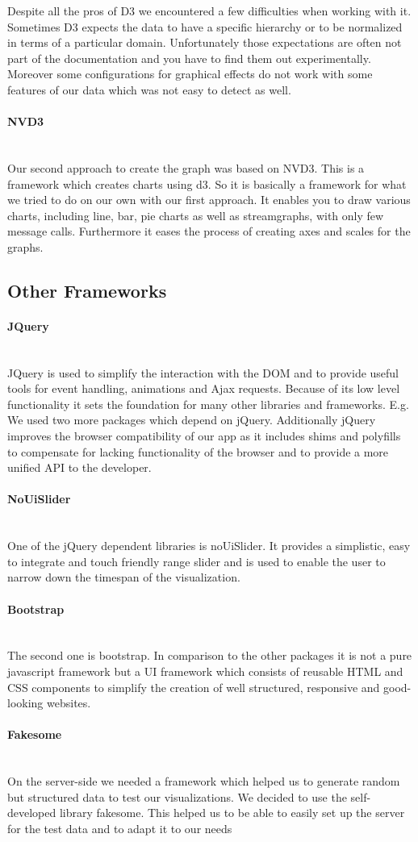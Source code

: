 \documentclass{llncs}
\newcommand{\myparagraph}[1]{\paragraph{#1}\mbox{}\\}
\begin{document}
Despite all the pros of D3 we encountered a few difficulties when working with it. Sometimes D3 expects the data to have a specific hierarchy or to be normalized in terms of a particular domain. Unfortunately those expectations are often not part of the documentation and you have to find them out experimentally. Moreover some configurations for graphical effects do not work with some features of our data which was not easy to detect as well.

\myparagraph{NVD3}
Our second approach to create the graph was based on NVD3. This is a framework which creates charts using d3. So it is basically a framework for what we tried to do on our own with our first approach. It enables you to draw various charts, including line, bar, pie charts as well as streamgraphs, with only few message calls. Furthermore it eases the process of creating axes and scales for the graphs.


\subsection{Other Frameworks}

\myparagraph{JQuery}
JQuery is used to simplify the interaction with the DOM and to provide useful tools for event handling, animations and Ajax requests. Because of its low level functionality it sets the foundation for many other libraries and frameworks. E.g. We used two more packages which depend on jQuery.
Additionally jQuery improves the browser compatibility of our app as it includes shims and polyfills to compensate for lacking functionality of the browser and to provide a more unified API to the developer.

\myparagraph{NoUiSlider}
One of the jQuery dependent libraries is noUiSlider. It provides a simplistic, easy to integrate and touch friendly range slider and is used to enable the user to narrow down the timespan of the visualization.

\myparagraph{Bootstrap}
The second one is bootstrap. In comparison to the other packages it is not a pure javascript framework but a UI framework which consists of reusable HTML and CSS components to simplify the creation of well structured, responsive and good-looking websites.

\myparagraph{Fakesome}
On the server-side we needed a framework which helped us to generate random but structured data to test our visualizations. We decided to use the self-developed library fakesome. This helped us to be able to easily set up the server for the test data and to adapt it to our needs
\end{document}
